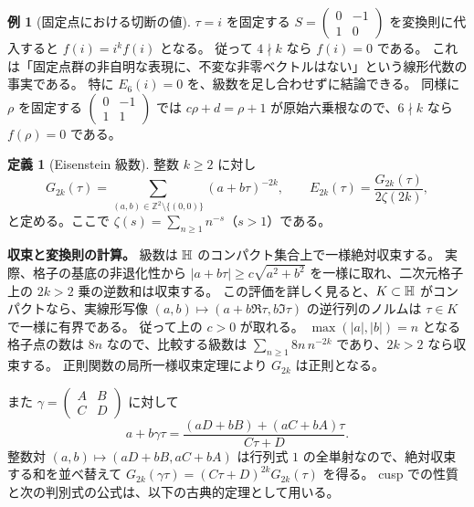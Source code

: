 \documentclass[dvipdfmx,a4paper,11pt]{article}
\theoremstyle{definition}
\newtheorem{dfn}[thm]{定義}
\newtheorem{exa}[thm]{例}
\newcommand{\C}{\mathbb C}\newcommand{\R}{\mathbb R}\newcommand{\Z}{\mathbb Z}\newcommand{\Q}{\mathbb Q}
\begin{document}
\begin{exa}[固定点における切断の値]
$\tau=i$ を固定する $S=\left(\begin{smallmatrix}0&-1\\1&0\end{smallmatrix}\right)$ を変換則に代入すると
$f(i)=i^k f(i)$ となる。
従って $4\nmid k$ なら $f(i)=0$ である。
これは「固定点群の非自明な表現に、不変な非零ベクトルはない」という線形代数の事実である。
特に $E_6(i)=0$ を、級数を足し合わせずに結論できる。
同様に $\rho$ を固定する $\left(\begin{smallmatrix}0&-1\\1&1\end{smallmatrix}\right)$ では $c\rho+d=\rho+1$ が原始六乗根なので、$6\nmid k$ なら $f(\rho)=0$ である。
\end{exa}

\begin{dfn}[Eisenstein 級数]
整数 $k\ge2$ に対し
\[
G_{2k}(\tau)=\sum_{(a,b)\in\Z^2\setminus\{(0,0)\}}(a+b\tau)^{-2k},
\qquad E_{2k}(\tau)=\frac{G_{2k}(\tau)}{2\zeta(2k)},
\]
と定める。ここで $\zeta(s)=\sum_{n\ge1}n^{-s}$（$s>1$）である。
\end{dfn}
\textbf{収束と変換則の計算。}
級数は $\mathbb H$ のコンパクト集合上で一様絶対収束する。
実際、格子の基底の非退化性から $|a+b\tau|\ge c\sqrt{a^2+b^2}$ を一様に取れ、二次元格子上の $2k>2$ 乗の逆数和は収束する。
この評価を詳しく見ると、$K\subset\mathbb H$ がコンパクトなら、実線形写像
$(a,b)\mapsto(a+b\Re\tau,b\Im\tau)$ の逆行列のノルムは $\tau\in K$ で一様に有界である。
従って上の $c>0$ が取れる。
$\max(|a|,|b|)=n$ となる格子点の数は $8n$ なので、比較する級数は
$\sum_{n\ge1}8n\,n^{-2k}$ であり、$2k>2$ なら収束する。
正則関数の局所一様収束定理により $G_{2k}$ は正則となる。

また $\gamma=\left(\begin{smallmatrix}A&B\\C&D\end{smallmatrix}\right)$ に対して
\[
a+b\gamma\tau
=\frac{(aD+bB)+(aC+bA)\tau}{C\tau+D}.
\]
整数対 $(a,b)\mapsto(aD+bB,aC+bA)$ は行列式 $1$ の全単射なので、絶対収束する和を並べ替えて
$G_{2k}(\gamma\tau)=(C\tau+D)^{2k}G_{2k}(\tau)$ を得る。
cusp での性質と次の判別式の公式は、以下の古典的定理として用いる。
\end{document}
